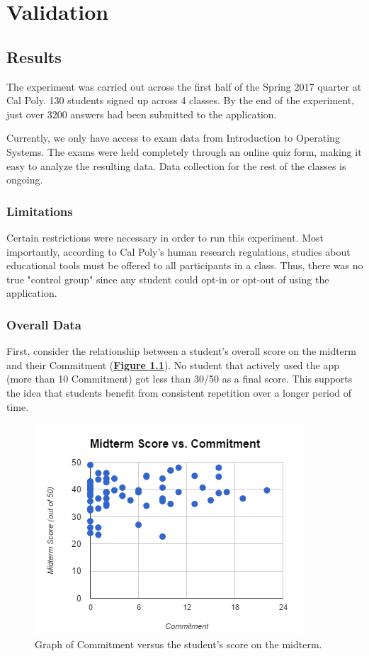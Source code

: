 \chapter{Validation}
\section{Results}
\par The experiment was carried out across the first half of the Spring 2017 quarter at Cal Poly. 130 students signed up across 4 classes. By the end of the experiment, just over 3200 answers had been submitted to the application.

\par Currently, we only have access to exam data from Introduction to Operating Systems. The exams were held completely through an online quiz form, making it easy to analyze the resulting data. Data collection for the rest of the classes is ongoing.

\subsection{Limitations}
\par Certain restrictions were necessary in order to run this experiment. Most importantly, according to Cal Poly's human research regulations, studies about educational tools must be offered to all participants in a class. Thus, there was no true "control group" since any student could opt-in or opt-out of using the application.

\subsection{Overall Data}
\par First, consider the relationship between a student's overall score on the midterm and their Commitment (\textbf{\hyperref[fig:comm_vs_score]{Figure \ref*{fig:comm_vs_score}}}). No student that actively used the app (more than 10 Commitment) got less than 30/50 as a final score. This supports the idea that students benefit from consistent repetition over a longer period of time.
 
 \begin{figure}[ht]
 	\includegraphics{figures/commitment-data1}
 	\caption{Graph of Commitment versus the student's score on the midterm.}
 	\label{fig:comm_vs_score}
 \end{figure}
 
